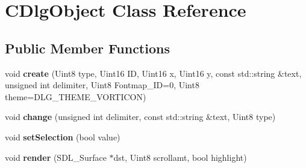 \hypertarget{class_c_dlg_object}{
\section{CDlgObject Class Reference}
\label{class_c_dlg_object}
}
\subsection*{Public Member Functions}
\begin{DoxyCompactItemize}
\item 
\hypertarget{class_c_dlg_object_ae7de8a08f43bcc4394317de540ab86a8}{
void {\bfseries create} (Uint8 type, Uint16 ID, Uint16 x, Uint16 y, const std::string \&text, unsigned int delimiter, Uint8 Fontmap\_\-ID=0, Uint8 theme=DLG\_\-THEME\_\-VORTICON)}
\label{class_c_dlg_object_ae7de8a08f43bcc4394317de540ab86a8}

\item 
\hypertarget{class_c_dlg_object_afa628447c62274b5ea5f7c87a5859e24}{
void {\bfseries change} (unsigned int delimiter, const std::string \&text, Uint8 type)}
\label{class_c_dlg_object_afa628447c62274b5ea5f7c87a5859e24}

\item 
\hypertarget{class_c_dlg_object_a357bae93cc50e25b51da7cc4042f623e}{
void {\bfseries setSelection} (bool value)}
\label{class_c_dlg_object_a357bae93cc50e25b51da7cc4042f623e}

\item 
\hypertarget{class_c_dlg_object_aa1042c69f71b94e0350b0d24ca8ed772}{
void {\bfseries render} (SDL\_\-Surface $\ast$dst, Uint8 scrollamt, bool highlight)}
\label{class_c_dlg_object_aa1042c69f71b94e0350b0d24ca8ed772}

\end{DoxyCompactItemize}
